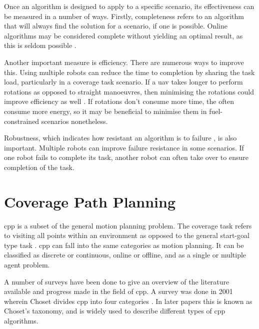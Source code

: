 
Once an algorithm is designed to apply to a specific scenario, its effectiveness can be measured in a  number of ways. Firstly, completeness refers to an algorithm that will always find the solution for a scenario, if one is possible\cite{Lavalle2006}. Online algorithms may be considered complete without yielding an optimal result, as this is seldom possible \cite{Choset2001}. 

Another important measure is efficiency\cite{Hazon2005}. There are numerous ways to improve this. Using multiple robots can reduce the time to completion by sharing the task load, particularly in a coverage task scenario. If a \acs{uav} takes longer to perform rotations as opposed to straight manoeuvres, then minimising the rotations could improve efficiency as well \cite{Choset2001}. If rotations don't consume more time, the often consume more energy, so it may be beneficial to minimise them in fuel-constrained scenarios nonetheless.

Robustness, which indicates how resistant an algorithm is to failure \cite{Hazon2005}, is also important. Multiple robots can improve failure resistance in some scenarios. If one robot fails to complete its task, another robot can often take over to ensure completion of the task. 

\section{Coverage Path Planning}
\label{sec:LR-CPP}
\acf{cpp} is a subset of the general motion planning problem. The coverage task refers to visiting all points within an environment as opposed to the general start-goal type task \cite{Zhang2020}. \acs{cpp} can fall into the same categories as motion planning. It can be classified as discrete or continuous, online or offline, and as a single or multiple agent problem.

A number of surveys have been done to give an overview of the literature available and progress made in the field of \acs{cpp}. A survey was done in 2001 wherein Choset divides \acs{cpp} into four categories \cite{Choset2001}. In later papers this is known as Choset's taxonomy, and is widely used to describe different types of \acs{cpp} algorithms.

